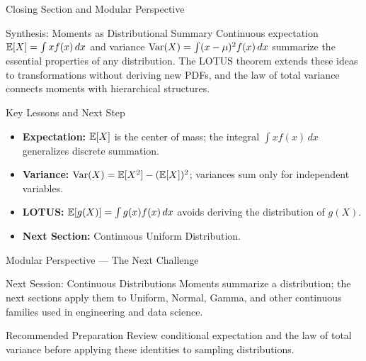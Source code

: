 \documentclass[aspectratio=169,xcolor={dvipsnames,table}]{beamer}
\begin{document}
\begin{frame}{Closing Section and Modular Perspective}
	\vspace{-0.2cm}
	\begin{block}{Synthesis: Moments as Distributional Summary}
		\scriptsize
		Continuous expectation $\mathbb{E}[X] = \int x f(x)\,dx$ and variance $\operatorname{Var}(X) = \int (x - \mu)^{2} f(x)\,dx$ summarize the essential properties of any distribution. The LOTUS theorem extends these ideas to transformations without deriving new PDFs, and the law of total variance connects moments with hierarchical structures.
	\end{block}
	\vspace{0.05cm}
	\pause
	\begin{alertblock}{Key Lessons and Next Step}
		\begin{itemize}\itemsep=0.05cm
			\item \textbf{Expectation:} $\mathbb{E}[X]$ is the center of mass; the integral $\int x f(x)\,dx$ generalizes discrete summation.
			\item \textbf{Variance:} $\operatorname{Var}(X) = \mathbb{E}[X^{2}] - (\mathbb{E}[X])^{2}$; variances sum only for independent variables.
			\item \textbf{LOTUS:} $\mathbb{E}[g(X)] = \int g(x) f(x)\,dx$ avoids deriving the distribution of $g(X)$.
			\item \textbf{Next Section:} \textcolor{TecRojo}{Continuous Uniform Distribution}.
		\end{itemize}
	\end{alertblock}
\end{frame}

\begin{frame}{Modular Perspective --- The Next Challenge}
\scriptsize
\begin{alertblock}{Next Session: Continuous Distributions}
Moments summarize a distribution; the next sections apply them to Uniform,
Normal, Gamma, and other continuous families used in engineering and data science.
\end{alertblock}
\begin{block}{Recommended Preparation}
Review conditional expectation and the law of total variance before applying these
identities to sampling distributions.
\end{block}
\end{frame}
\end{document}
